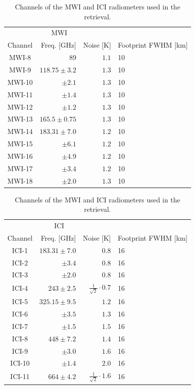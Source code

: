 \documentclass[journal abbreviation, manuscript]{copernicus}
\begin{document}
\begin{table}[hbpt]
\caption{Channels of the MWI and ICI radiometers used in the retrieval.}
\label{tab:channels}
    \begin{tabular}{c|r|r|p{2cm}}
    \multicolumn{3}{c}{MWI}\\
    Channel & Freq. [GHz] & Noise [K] & Footprint FWHM [km]\\
    \hline
    MWI-8  & $89$              & $1.1$ & 10\\
    MWI-9  & $118.75 \pm 3.2$  & $1.3$ & 10\\
    MWI-10 & $\pm 2.1$         & $1.3$ & 10\\
    MWI-11 & $\pm 1.4$         & $1.3$ & 10\\
    MWI-12 & $\pm 1.2$         & $1.3$ & 10\\
    MWI-13 & $165.5 \pm 0.75$  & $1.3$ & 10\\
    MWI-14 & $183.31 \pm 7.0$  & $1.2$ & 10\\
    MWI-15 & $ \pm 6.1$        & $1.2$ & 10\\
    MWI-16 & $ \pm 4.9$        & $1.2$ & 10\\
    MWI-17 & $ \pm 3.4$        & $1.2$ & 10\\
    MWI-18 & $ \pm 2.0$        & $1.3$ & 10\\
    \end{tabular}%
    \hspace{1cm}%
    \begin{tabular}{c|r|r|p{2cm}}
    \multicolumn{3}{c}{ICI}\\
    Channel & Freq. [GHz] & Noise [K]  & Footprint FWHM [km]\\
    \hline
    ICI-1  & $183.31 \pm 7.0$ & $0.8$ & 16\\
    ICI-2  & $       \pm 3.4$ & $0.8$ & 16\\
    ICI-3  & $       \pm 2.0$ & $0.8$ & 16\\
    ICI-4  & $243    \pm 2.5$ & $\frac{1}{\sqrt{2}} \cdot 0.7$ & 16\\
    ICI-5  & $325.15 \pm 9.5$ & $1.2$ & 16\\
    ICI-6  & $       \pm 3.5$ & $1.3$ & 16\\
    ICI-7  & $       \pm 1.5$ & $1.5$ & 16\\
    ICI-8  & $448    \pm 7.2$ & $1.4$ & 16\\
    ICI-9  & $       \pm 3.0$ & $1.6$ & 16\\
    ICI-10 & $       \pm 1.4$ & $2.0$ & 16\\
    ICI-11 & $664    \pm 4.2$ & $\frac{1}{\sqrt{2}} \cdot 1.6$ & 16\\
    \end{tabular}
\end{table}
\end{document}
